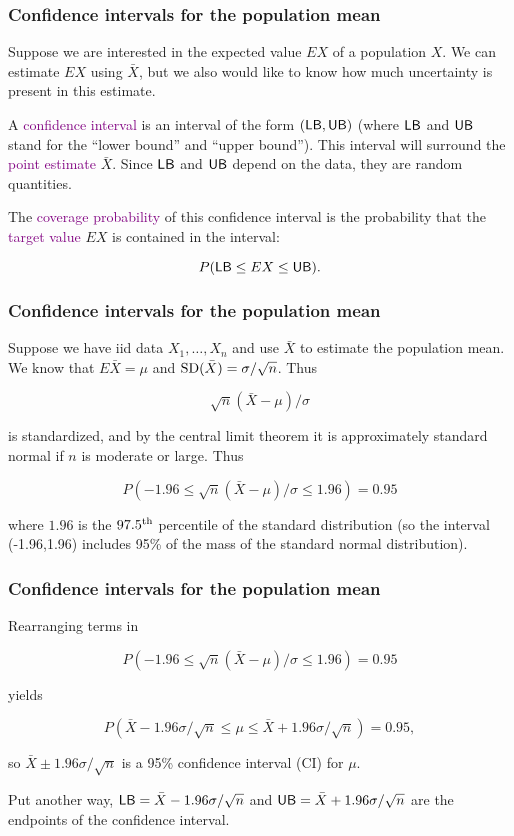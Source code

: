 \begin{frame}
\frametitle{Confidence intervals for the population mean}

Suppose we are interested in the expected value $EX$ of a population
$X$.  We can estimate $EX$ using $\bar{X}$, but we also would like to
know how much uncertainty is present in this estimate.

A \textcolor{purple}{confidence interval} is an interval of the form
$({\sf LB},{\sf UB})$ (where ${\sf LB}$ and ${\sf UB}$ stand for the
``lower bound'' and ``upper bound'').  This interval will surround the
\textcolor{purple}{point estimate} $\bar{X}$.  Since ${\sf LB}$ and
${\sf UB}$ depend on the data, they are random quantities.

The \textcolor{purple}{coverage probability} of this confidence
interval is the probability that the \textcolor{purple}{target value}
$EX$ is contained in the interval:

$$
P({\sf LB} \le EX \le {\sf UB}).
$$




\end{frame}


\begin{frame}
\frametitle{Confidence intervals for the population mean}

Suppose we have iid data $X_1, \ldots, X_n$ and use $\bar{X}$ to
estimate the population mean.  We know that $E\bar{X} = \mu$ and ${\rm
SD}(\bar{X}) = \sigma/\sqrt{n}$.  Thus

$$
\sqrt{n}(\bar{X} - \mu)/\sigma
$$

is standardized, and by the central limit theorem it is approximately
standard normal if $n$ is moderate or large.  Thus

$$
P(-1.96 \le \sqrt{n}(\bar{X} - \mu)/\sigma \le 1.96) = 0.95
$$

where $1.96$ is the $97.5^{\rm th}$ percentile of the standard
distribution (so the interval (-1.96,1.96) includes 95\% of the mass
of the standard normal distribution).

\end{frame}

\begin{frame}
\frametitle{Confidence intervals for the population mean}

Rearranging terms in

$$
P(-1.96 \le \sqrt{n}(\bar{X} - \mu)/\sigma \le 1.96) = 0.95
$$

yields

$$ P(\bar{X}-1.96\sigma/\sqrt{n} \le \mu \le \bar{X} +
1.96\sigma/\sqrt{n}) = 0.95,
$$

so $\bar{X} \pm 1.96\sigma/\sqrt{n}$ is a 95\% confidence interval
(CI) for $\mu$.

Put another way, ${\sf LB} = \bar{X}-1.96\sigma/\sqrt{n}$ and ${\sf
 UB} = \bar{X} + 1.96\sigma/\sqrt{n}$ are the endpoints of the
confidence interval.

\end{frame}

